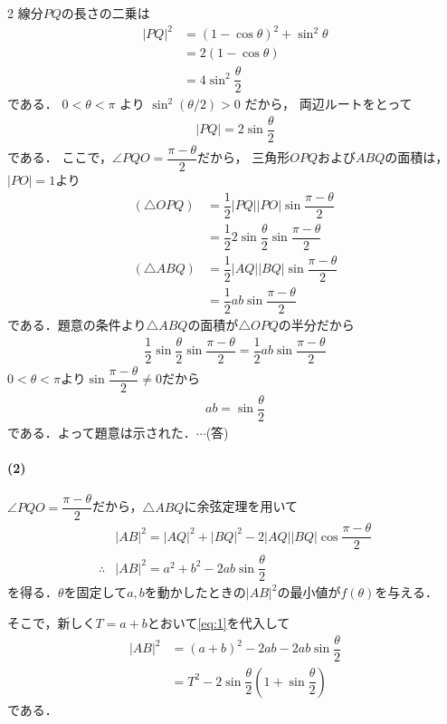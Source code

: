 \documentclass[../../main.tex]{subfiles}
\begin{document}
\begin{multicols}{2}
  線分$PQ$の長さの二乗は
  \begin{align}
    |PQ|^2
    & = (1-\cos\theta)^2 + \sin^2\theta \\
    & = 2(1-\cos\theta)                 \\
    & = 4\sin^2\dfrac{\theta}{2}
  \end{align}
  である．
  $0 < \theta < \pi$ より $\sin^2(\theta/2) > 0$ だから，
  両辺ルートをとって
  \begin{align}
    |PQ| = 2\sin\dfrac{\theta}{2}
  \end{align}
  である．
  ここで，$\angle PQO = \dfrac{\pi-\theta}{2}$だから，
  三角形$OPQ$および$ABQ$の面積は，$|PO|=1$より
  \begin{align}
    (\triangle OPQ)
    & = \dfrac{1}{2}|PQ||PO|\sin\dfrac{\pi-\theta}{2}                \\
    & = \dfrac{1}{2} 2\sin\dfrac{\theta}{2} \sin\dfrac{\pi-\theta}{2} \\
    (\triangle ABQ)
    & = \dfrac{1}{2}|AQ||BQ|\sin\dfrac{\pi-\theta}{2}                \\
    & = \dfrac{1}{2} ab \sin\dfrac{\pi-\theta}{2}
  \end{align}
  である．題意の条件より$\triangle ABQ$の面積が$\triangle OPQ$の半分だから
  \begin{align}
    \dfrac{1}{2} \sin\dfrac{\theta}{2} \sin\dfrac{\pi-\theta}{2} =  \dfrac{1}{2} ab \sin\dfrac{\pi-\theta}{2}
  \end{align}
  $0<\theta<\pi$より$\sin\dfrac{\pi-\theta}{2}\neq 0$だから
  \begin{align}
    ab = \sin\dfrac{\theta}{2} \label{eq:1}
  \end{align}
  である．よって題意は示された．$\cdots$(答)

  \paragraph{(2)}
  $\angle PQO=\dfrac{\pi-\theta}{2}$だから，$\triangle ABQ$に余弦定理を用いて
  \begin{align}
    & |AB|^2 = |AQ|^2 + |BQ|^2 -2 |AQ||BQ|\cos \dfrac{\pi-\theta}{2} \\
    \therefore
    & |AB|^2 = a^2 + b^2 -2ab\sin\dfrac{\theta}{2}
  \end{align}
  を得る．$\theta$を固定して$a,b$を動かしたときの$|AB|^2$の最小値が$f(\theta)$を与える．

  そこで，新しく$T=a+b$とおいて\cref{eq:1}を代入して
  \begin{align}
    |AB|^2
    & = (a+b)^2 - 2ab -2ab\sin\dfrac{\theta}{2}                                            \\
    & = T^2 -2\sin\dfrac{\theta}{2}\left(1+\sin\dfrac{\theta}{2}\right) \label{eq:2}
  \end{align}
  である．


\end{multicols}
\end{document}
